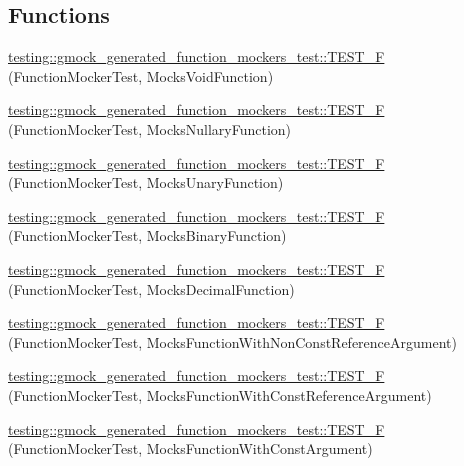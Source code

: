 \subsection*{Functions}
\begin{DoxyCompactItemize}
\item 
\mbox{\hyperlink{namespacetesting_1_1gmock__generated__function__mockers__test_aee64a5117451830331c321aecd10025f}{testing\+::gmock\+\_\+generated\+\_\+function\+\_\+mockers\+\_\+test\+::\+T\+E\+S\+T\+\_\+F}} (Function\+Mocker\+Test, Mocks\+Void\+Function)
\item 
\mbox{\hyperlink{namespacetesting_1_1gmock__generated__function__mockers__test_a0a1348d6814b9bc02ad5b2ac46361ac0}{testing\+::gmock\+\_\+generated\+\_\+function\+\_\+mockers\+\_\+test\+::\+T\+E\+S\+T\+\_\+F}} (Function\+Mocker\+Test, Mocks\+Nullary\+Function)
\item 
\mbox{\hyperlink{namespacetesting_1_1gmock__generated__function__mockers__test_a835348f70c0335c9213153f72138d12f}{testing\+::gmock\+\_\+generated\+\_\+function\+\_\+mockers\+\_\+test\+::\+T\+E\+S\+T\+\_\+F}} (Function\+Mocker\+Test, Mocks\+Unary\+Function)
\item 
\mbox{\hyperlink{namespacetesting_1_1gmock__generated__function__mockers__test_aa8d2e25f60ad3ac49736ee90fb7ac190}{testing\+::gmock\+\_\+generated\+\_\+function\+\_\+mockers\+\_\+test\+::\+T\+E\+S\+T\+\_\+F}} (Function\+Mocker\+Test, Mocks\+Binary\+Function)
\item 
\mbox{\hyperlink{namespacetesting_1_1gmock__generated__function__mockers__test_a279ba48bf6f937eecfc12530b9dde497}{testing\+::gmock\+\_\+generated\+\_\+function\+\_\+mockers\+\_\+test\+::\+T\+E\+S\+T\+\_\+F}} (Function\+Mocker\+Test, Mocks\+Decimal\+Function)
\item 
\mbox{\hyperlink{namespacetesting_1_1gmock__generated__function__mockers__test_a852587f21316c0341b60b29d44cd61ea}{testing\+::gmock\+\_\+generated\+\_\+function\+\_\+mockers\+\_\+test\+::\+T\+E\+S\+T\+\_\+F}} (Function\+Mocker\+Test, Mocks\+Function\+With\+Non\+Const\+Reference\+Argument)
\item 
\mbox{\hyperlink{namespacetesting_1_1gmock__generated__function__mockers__test_a5367aba117b37aff1ceb4be3d4732559}{testing\+::gmock\+\_\+generated\+\_\+function\+\_\+mockers\+\_\+test\+::\+T\+E\+S\+T\+\_\+F}} (Function\+Mocker\+Test, Mocks\+Function\+With\+Const\+Reference\+Argument)
\item 
\mbox{\hyperlink{namespacetesting_1_1gmock__generated__function__mockers__test_a957ee1afed65097f1c25790f266ec91e}{testing\+::gmock\+\_\+generated\+\_\+function\+\_\+mockers\+\_\+test\+::\+T\+E\+S\+T\+\_\+F}} (Function\+Mocker\+Test, Mocks\+Function\+With\+Const\+Argument)

\end{DoxyCompactItemize}
